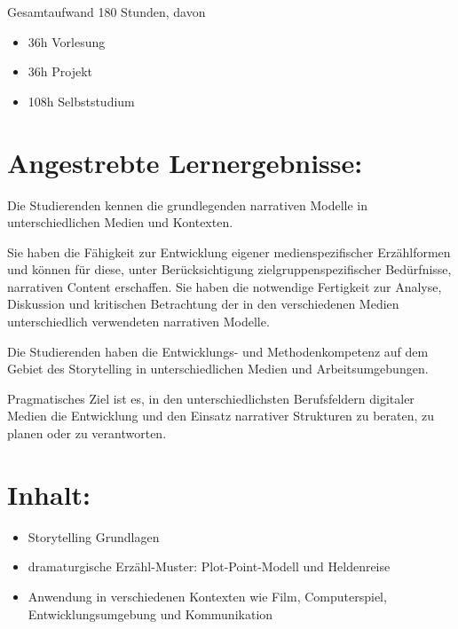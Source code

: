 Gesamtaufwand 180 Stunden, davon

\begin{itemize}
\tightlist
\item
  36h Vorlesung
\item
  36h Projekt
\item
  108h Selbststudium
\end{itemize}

\section*{Angestrebte
Lernergebnisse:\label{/mi-2017/modulbeschreibungen-master/MA_VC_Modul_Storytelling}}\label{angestrebte-lernergebnissepathlabelmi-2017modulbeschreibungen-mastermaux5fvcux5fmodulux5fstorytelling}

Die Studierenden kennen die grundlegenden narrativen Modelle in
unterschiedlichen Medien und Kontexten.

Sie haben die Fähigkeit zur Entwicklung eigener medienspezifischer
Erzählformen und können für diese, unter Berücksichtigung
zielgruppenspezifischer Bedürfnisse, narrativen Content erschaffen. Sie
haben die notwendige Fertigkeit zur Analyse, Diskussion und kritischen
Betrachtung der in den verschiedenen Medien unterschiedlich verwendeten
narrativen Modelle.

Die Studierenden haben die Entwicklungs- und Methodenkompetenz auf dem
Gebiet des Storytelling in unterschiedlichen Medien und
Arbeitsumgebungen.

Pragmatisches Ziel ist es, in den unterschiedlichsten Berufsfeldern
digitaler Medien die Entwicklung und den Einsatz narrativer Strukturen
zu beraten, zu planen oder zu verantworten.

\section*{Inhalt:\label{/mi-2017/modulbeschreibungen-master/MA_VC_Modul_Storytelling}}\label{inhaltpathlabelmi-2017modulbeschreibungen-mastermaux5fvcux5fmodulux5fstorytelling}

\begin{itemize}
\tightlist
\item
  Storytelling Grundlagen
\item
  dramaturgische Erzähl-Muster: Plot-Point-Modell und Heldenreise
\item
  Anwendung in verschiedenen Kontexten wie Film, Computerspiel,
  Entwicklungsumgebung und Kommunikation
\end{itemize}

